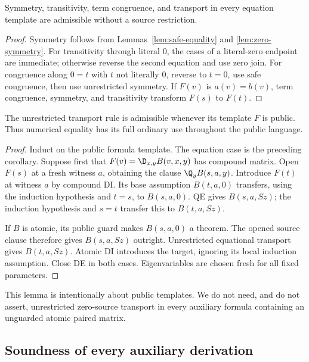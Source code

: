 \begin{corollary}
Symmetry, transitivity, term congruence, and transport in every equation
template are admissible without a source restriction.
\end{corollary}
\begin{proof}
Symmetry follows from Lemmas~\ref{lem:safe-equality} and
\ref{lem:zero-symmetry}.  For transitivity through literal $0$, the
cases of a literal-zero endpoint are immediate; otherwise reverse the
second equation and use zero join.  For congruence along $0=t$ with
$t$ not literally $0$, reverse to $t=0$, use safe congruence, then
use unrestricted symmetry.  If $F(v)$ is $a(v)=b(v)$, term
congruence, symmetry, and transitivity transform $F(s)$ to $F(t)$.
\end{proof}

\begin{lemma}\label{lem:public-transport}
The unrestricted transport rule is admissible whenever its template $F$
is public.  Thus numerical equality has its full ordinary use throughout
the public language.
\end{lemma}
\begin{proof}
Induct on the public formula template.  The equation case is the preceding
corollary.  Suppose first that $F(v)=\D_{x,y}B(v,x,y)$ has compound
matrix.  Open $F(s)$ at a fresh witness $a$, obtaining the clause
$\Q_y B(s,a,y)$.  Introduce $F(t)$ at witness $a$ by compound DI.
Its base assumption $B(t,a,0)$ transfers, using the induction hypothesis
and $t=s$, to $B(s,a,0)$.  QE gives $B(s,a,Sz)$; the induction
hypothesis and $s=t$ transfer this to $B(t,a,Sz)$.

If $B$ is atomic, its public guard makes $B(s,a,0)$ a theorem.
The opened source clause therefore gives $B(s,a,Sz)$ outright.
Unrestricted equational transport gives $B(t,a,Sz)$.  Atomic DI
introduces the target, ignoring its local induction assumption.
Close DE in both cases.  Eigenvariables are chosen fresh for all fixed
parameters.
\end{proof}

This lemma is intentionally about public templates.  We do not need, and
do not assert, unrestricted zero-source transport in every auxiliary
formula containing an unguarded atomic paired matrix.

\subsection{Soundness of every auxiliary derivation}

